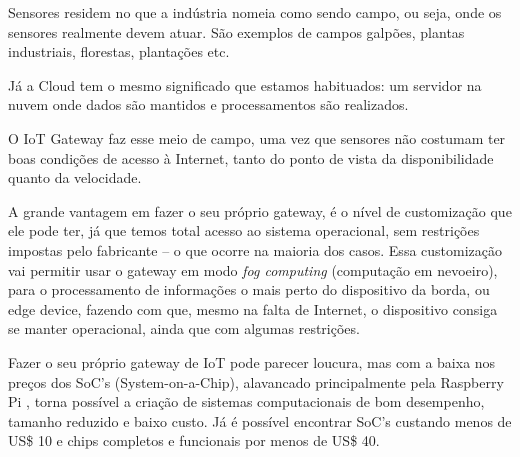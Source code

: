 Sensores residem no que a indústria nomeia como sendo campo, ou seja, onde os sensores realmente devem atuar. São exemplos de campos galpões, plantas industriais, florestas, plantações etc.

Já a Cloud tem o mesmo significado que estamos habituados: um servidor na nuvem onde dados são mantidos e processamentos são realizados.

O IoT Gateway faz esse meio de campo, uma vez que sensores não costumam ter boas condições de acesso à Internet, tanto do ponto de vista da disponibilidade quanto da velocidade.

A grande vantagem em fazer o seu próprio gateway, é o nível de customização que ele pode ter, já que temos total acesso ao sistema operacional, sem restrições impostas pelo fabricante – o que ocorre na maioria dos casos. Essa customização vai permitir usar o gateway em modo \textit{fog computing} (computação em nevoeiro), para o processamento de informações o mais perto do dispositivo da borda, ou edge device, fazendo com que, mesmo na falta de Internet, o dispositivo consiga se manter operacional, ainda que com algumas restrições.

Fazer o seu próprio gateway de IoT pode parecer loucura, mas com a baixa nos preços dos SoC’s (System-on-a-Chip), alavancado principalmente pela Raspberry Pi \cite{RaspberryPi}, torna possível a criação de sistemas computacionais de bom desempenho, tamanho reduzido e baixo custo. Já é possível encontrar SoC’s custando menos de US\$ 10 e chips completos e funcionais por menos de US\$ 40.
